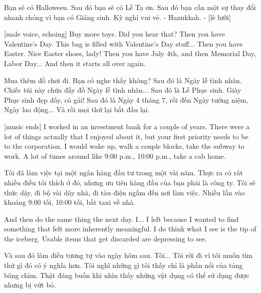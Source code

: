 \documentclass[a4paper]{article}
\begin{document}
	\begin{vietnamese-v2}
		[Anna] Bạn sẽ có Halloween.
		Sau đó bạn sẽ có Lễ Tạ ơn.
		Sau đó bạn cần một sự thay đổi nhanh chóng vì bạn có Giáng sinh.
		Kỳ nghỉ vui vẻ.
		- Hanukkah. - [lè lưỡi]
	\end{vietnamese-v2}
	
	[male voice, echoing] Buy more toys.
	Did you hear that?
	Then you have Valentine's Day.
	This bag is filled with Valentine's Day stuff...
	Then you have Easter.
	Nice Easter shoes, lady!
	Then you have July 4th, and then Memorial Day, Labor Day...
	And then it starts all over again.
	
	\begin{vietnamese-v2}
		 Mua thêm đồ chơi đi.
		Bạn có nghe thấy không?
		Sau đó là Ngày lễ tình nhân.
		Chiếc túi này chứa đầy đồ Ngày lễ tình nhân...
		Sau đó là Lễ Phục sinh.
		Giày Phục sinh đẹp đấy, cô gái!
		Sau đó là Ngày 4 tháng 7, rồi đến Ngày tưởng niệm, Ngày lao động...
		Và rồi mọi thứ lại bắt đầu lại.	
	\end{vietnamese-v2}
	
	[music ends]
	I worked in an investment bank for a couple of years.
	There were a lot of things actually that I enjoyed about it, but your first priority needs to be to the corporation.
	I would wake up, walk a couple blocks, take the subway to work.
	A lot of times around like 9:00 p.m., 10:00 p.m., take a cab home.
	
	\begin{vietnamese-v2}
		Tôi đã làm việc tại một ngân hàng đầu tư trong một vài năm.
		Thực ra có rất nhiều điều tôi thích ở đó, nhưng ưu tiên hàng đầu của bạn phải là công ty.
		Tôi sẽ thức dậy, đi bộ vài dãy nhà, đi tàu điện ngầm đến nơi làm việc.
		Nhiều lần vào khoảng 9:00 tối, 10:00 tối, bắt taxi về nhà.
	\end{vietnamese-v2}
	
	And then do the same thing the next day.
	I... I left because I wanted to find something that felt more inherently meaningful.
	I do think what I see is the tip of the iceberg.
	Usable items that get discarded are depressing to see.
	
	\begin{vietnamese-v2}
		Và sau đó làm điều tương tự vào ngày hôm sau.
		Tôi... Tôi rời đi vì tôi muốn tìm thứ gì đó có ý nghĩa hơn.
		Tôi nghĩ những gì tôi thấy chỉ là phần nổi của tảng băng chìm.
		Thật đáng buồn khi nhìn thấy những vật dụng có thể sử dụng được nhưng bị vứt bỏ.
	\end{vietnamese-v2}
	
\end{document}
